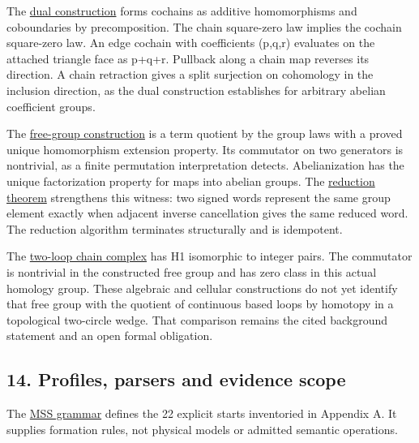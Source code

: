 \documentclass[
  11pt,
]{article}
\begin{document}
The \href{lean4/Cochain.lean}{dual construction} forms cochains as
additive homomorphisms and coboundaries by precomposition. The chain
square-zero law implies the cochain square-zero law. An edge cochain
with coefficients (p,q,r) evaluates on the attached triangle face as
p+q+r. Pullback along a chain map reverses its direction. A chain
retraction gives a split surjection on cohomology in the inclusion
direction, as the dual construction establishes for arbitrary abelian
coefficient groups.

The \href{lean4/FreeGroup.lean}{free-group construction} is a term
quotient by the group laws with a proved unique homomorphism extension
property. Its commutator on two generators is nontrivial, as a finite
permutation interpretation detects. Abelianization has the unique
factorization property for maps into abelian groups. The
\href{lean4/FreeWord.lean}{reduction theorem} strengthens this witness:
two signed words represent the same group element exactly when adjacent
inverse cancellation gives the same reduced word. The reduction
algorithm terminates structurally and is idempotent.

The \href{lean4/WedgeHomology.lean}{two-loop chain complex} has H1
isomorphic to integer pairs. The commutator is nontrivial in the
constructed free group and has zero class in this actual homology group.
These algebraic and cellular constructions do not yet identify that free
group with the quotient of continuous based loops by homotopy in a
topological two-circle wedge. That comparison remains the cited
background statement and an open formal obligation.

\Needspace{260pt}
\subsection{14. Profiles, parsers and evidence
scope}\label{profiles-parsers-and-evidence-scope}

The \href{code/grammar/mssn.ebnf}{MSS grammar} defines the 22 explicit
starts inventoried in Appendix A. It supplies formation rules, not
physical models or admitted semantic operations.
\end{document}
